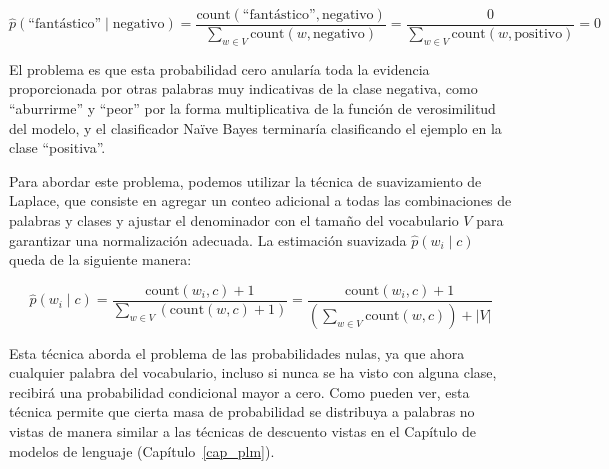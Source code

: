 \[
\hat{p}(\text{``fantástico''} \mid \text{negativo}) = \frac{\text{count}(\text{``fantástico''}, \text{negativo})}{\sum_{w \in V} \text{count}(w, \text{negativo})} = \frac{0}{\sum_{w \in V} \text{count}(w, \text{positivo})} = 0
\]

El problema es que esta probabilidad cero anularía toda la evidencia proporcionada por otras palabras muy indicativas de la clase negativa, como ``aburrirme'' y ``peor'' por la forma multiplicativa de la función de verosimilitud del modelo, y el clasificador Naïve Bayes terminaría clasificando el ejemplo en la clase ``positiva''.

Para abordar este problema, podemos utilizar la técnica de suavizamiento de Laplace, que consiste en agregar un conteo adicional a todas las combinaciones de palabras y clases y ajustar el denominador con el tamaño del vocabulario $V$ para garantizar una normalización adecuada. La estimación suavizada $\hat{p}(w_i \mid c)$ queda de la siguiente manera:

\[
\hat{p}(w_i \mid c) = \frac{\text{count}(w_i, c) + 1}{\sum_{w \in V} (\text{count}(w, c) + 1)} = \frac{\text{count}(w_i, c) + 1}{(\sum_{w \in V} \text{count}(w, c))+|V|}
\]

Esta técnica aborda el problema de las probabilidades nulas, ya que ahora cualquier palabra del vocabulario, incluso si nunca se ha visto con alguna clase, recibirá una probabilidad condicional mayor a cero. Como pueden ver, esta técnica permite que cierta masa de probabilidad se distribuya a palabras no vistas de manera similar a  las técnicas de descuento vistas en el Capítulo de modelos de lenguaje (Capítulo~\ref{cap_plm}).



